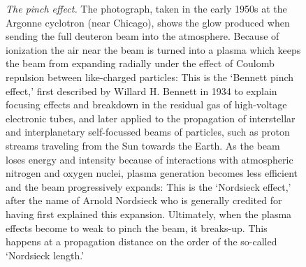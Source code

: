 \documentclass [12pt,a4paper,     ]{report} %
\begin{document}
%
\begin{figure}
\begin{center}
\caption[The pinch effect]{\emph{The pinch effect.} The photograph, taken in the early 1950s at the Argonne cyclotron (near Chicago), shows the glow produced when sending the full deuteron beam into the atmosphere.  Because of ionization the air near the beam is turned into a plasma which keeps the beam from expanding radially under the effect of Coulomb repulsion between like-charged particles: This is the `Bennett pinch effect,' first described by Willard H. Bennett in 1934 to explain focusing effects and breakdown in the residual gas of high-voltage electronic tubes, and later applied to the propagation of interstellar and interplanetary self-focussed beams of particles, such as proton streams traveling from the Sun towards the Earth.  As the beam loses energy and intensity because of interactions with atmospheric nitrogen and oxygen nuclei, plasma generation becomes less efficient and the beam progressively expands: This is the `Nordsieck effect,' after the name of Arnold Nordsieck who is generally credited for having first explained this expansion.  Ultimately, when the plasma effects become to weak to pinch the beam, it breaks-up.  This happens at a propagation distance on the order of the so-called `Nordsieck length.'  
\label{fig:pin}}
\end{center}
\end{figure}
%
\end{document}
